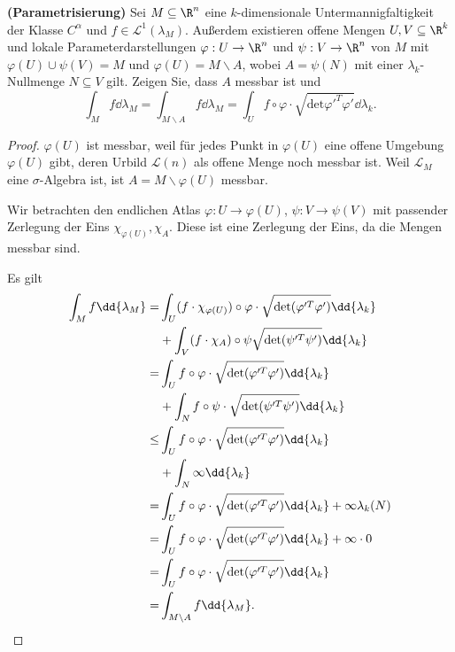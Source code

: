 \begin{Problem}
	\textbf{(Parametrisierung)} Sei $M\subseteq \R^n$ eine $k$-dimensionale Untermannigfaltigkeit der Klasse $C^\alpha$ und $f\in \mathcal{L}^1(\lambda_M)$. Außerdem existieren offene Mengen $U,V\subseteq \R^k$ und lokale Parameterdarstellungen $\varphi:U\to \R^n$ und $\psi:V\to\R^n$ von $M$ mit $\varphi(U)\cup \psi(V)=M$ und $\varphi(U)=M\backslash A$, wobei $A=\psi(N)$ mit einer $\lambda_k$-Nullmenge $N\subseteq V$ gilt. Zeigen Sie, dass $A$ messbar ist und
          \[
		\int_M f\dd{\lambda_M}=\int_{M\backslash A} f\dd{\lambda_M}=\int_U f\circ \varphi \cdot \sqrt{\text{det}\varphi'^T\varphi'} \dd{\lambda_k}
	.\] 
\end{Problem}
\begin{proof}
	$\varphi(U)$ ist messbar, weil f\"{u}r jedes Punkt in $\varphi(U)$ eine offene Umgebung $\varphi(U)$ gibt, deren Urbild $\mathcal{L}(n)$ als offene Menge noch messbar ist. Weil $\mathcal{L}_M$ eine $\sigma$-Algebra ist, ist $A=M\backslash \varphi(U)$ messbar.

	Wir betrachten den endlichen Atlas $\varphi:U\to \varphi(U)$, $\psi:V\to \psi(V)$ mit passender Zerlegung der Eins $\chi_{\varphi(U)}, \chi_{A}$. Diese ist eine Zerlegung der Eins, da die Mengen messbar sind.

	Es gilt
	\begin{align*}
		\int_M f\dd{\lambda_M}=&\int_{U}(f\cdot \chi_{\varphi(U)})\circ\varphi \cdot \sqrt{\text{det}(\varphi^{\prime T}\varphi')} \dd{\lambda_k}\\
				       &+\int_V (f\cdot \chi_{A})\circ \psi \sqrt{\text{det}(\psi^{\prime T}\psi')}\dd{\lambda_k}\\
		=&\int_U f\circ\varphi\cdot \sqrt{\text{det}(\varphi^{\prime T}\varphi')} \dd{\lambda_k}\\
		 &+\int_N  f\circ\psi\cdot \sqrt{\text{det}(\psi^{\prime T}\psi')} \dd{\lambda_k}\\
		\le&\int_U f\circ\varphi\cdot \sqrt{\text{det}(\varphi^{\prime T}\varphi')} \dd{\lambda_k}\\
		 &+\int_N  \infty\dd{\lambda_k}\\
		=&\int_U f\circ\varphi\cdot \sqrt{\text{det}(\varphi^{\prime T}\varphi')} \dd{\lambda_k}+\infty\lambda_k(N)\\
		=&\int_U f\circ\varphi\cdot \sqrt{\text{det}(\varphi^{\prime T}\varphi')} \dd{\lambda_k}+\infty\cdot 0\\
		=&\int_U f\circ\varphi\cdot \sqrt{\text{det}(\varphi^{\prime T}\varphi')} \dd{\lambda_k}\\
		=&\int_{M\backslash A}f\dd{\lambda_M}.\qedhere
	\end{align*}
\end{proof}

